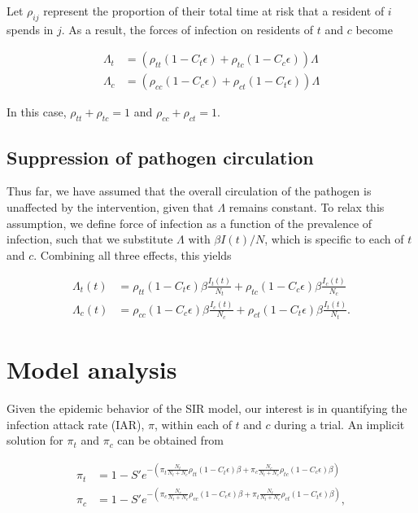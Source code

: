 \documentclass[11pt]{amsart}
\begin{document}
Let $\rho_{ij}$ represent the proportion of their total time at risk that a resident of $i$ spends in $j$. As a result, the forces of infection on residents of $t$ and $c$ become

\begin{align}
\Lambda_t &= \left(\rho_{tt}(1-C_t\epsilon) + \rho_{tc}(1-C_c\epsilon)\right)\Lambda \\
\Lambda_c &= \left(\rho_{cc}(1-C_c\epsilon) + \rho_{ct}(1-C_t\epsilon)\right)\Lambda
\end{align}

\noindent In this case, $\rho_{tt}+\rho_{tc}=1$ and $\rho_{cc}+\rho_{ct}=1$.


\subsection{Suppression of pathogen circulation}

Thus far, we have assumed that the overall circulation of the pathogen is unaffected by the intervention, given that $\Lambda$ remains constant. To relax this assumption, we define force of infection as a function of the prevalence of infection, such that we substitute $\Lambda$ with $\beta I(t)/N$, which is specific to each of $t$ and $c$. Combining all three effects, this yields 

\begin{align}
\Lambda_t(t) &= \rho_{tt}(1-C_t\epsilon)\beta\frac{I_t(t)}{N_t} + \rho_{tc}(1-C_c\epsilon)\beta\frac{I_c(t)}{N_c} \\
\Lambda_c(t) &= \rho_{cc}(1-C_c\epsilon)\beta\frac{I_c(t)}{N_c} + \rho_{ct}(1-C_t\epsilon)\beta\frac{I_t(t)}{N_t}.
\end{align}


\section{Model analysis}

Given the epidemic behavior of the SIR model, our interest is in quantifying the infection attack rate (IAR), $\pi$, within each of $t$ and $c$ during a trial. An implicit solution for $\pi_t$ and $\pi_c$ can be obtained from

\begin{align}
\pi_t &= 1 - S' e ^ {-\left(\pi_t \frac{N_t}{N_t+N_c} \rho_{tt} (1 - C_t \epsilon) \beta + \pi_c \frac{N_c}{N_t+N_c} \rho_{tc} (1 - C_c \epsilon) \beta \right)} \\
\pi_c &= 1 - S' e ^ {-\left(\pi_c \frac{N_c}{N_t+N_c} \rho_{cc} (1 - C_c \epsilon) \beta + \pi_t \frac{N_t}{N_t+N_c} \rho_{ct} (1 - C_t \epsilon) \beta \right)} ,
\end{align}
\end{document}
